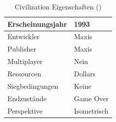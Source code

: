 \begin{table}[]
    \centering
    \caption{Civilization Eigenschaften (\cite*[]{civallcompare,civigdb,civwin, civ:ressources})}
    \label{table:civ}
    \begin{tabular}{|l|l|}
    \hline
    Erscheinungsjahr & 1993                                                                           \\ \hline
    Entwickler       & Maxis                                                                      \\ \hline
    Publisher        & Maxis                                                                      \\ \hline
    Multiplayer      & Nein                                                                           \\ \hline
    Ressourcen       & Dollars \\ \hline
    Siegbedingungen  & Keine                                               \\ \hline
    Endzustände  & Game Over                                               \\ \hline
    Perspektive      & Isometrisch                                                                          \\ \hline
    \end{tabular}
\end{table}

